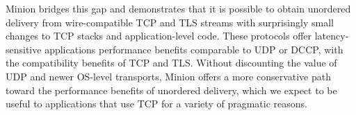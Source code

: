 Minion bridges this gap 
and demonstrates that it is possible to obtain
unordered delivery from wire-compatible TCP and TLS streams
with surprisingly small changes to TCP stacks
and application-level code.
These protocols offer latency-sensitive applications
performance benefits comparable to UDP or DCCP,
with the compatibility benefits of TCP and TLS.
Without discounting the value of UDP and newer OS-level transports,
Minion offers a more conservative path toward
the performance benefits of unordered delivery,
which we expect to be useful to applications
that use TCP for a variety of pragmatic reasons.

